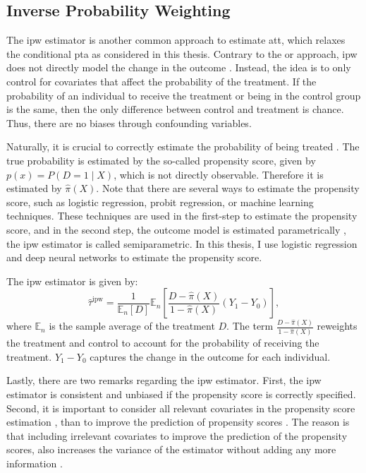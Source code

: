 \subsection{Inverse Probability Weighting}
The \ac{ipw} estimator is another common approach to estimate \ac{att}, which relaxes the conditional \ac{pta} as considered in this thesis.
Contrary to the \ac{or} approach, \ac{ipw} does not directly model the change in the outcome \citep{santannaDoublyRobustDifferenceindifferences2020}.
Instead, the idea is to only control for covariates that affect the probability of the treatment.
If the probability of an individual to receive the treatment or being in the control group is the same, then the only difference between control and treatment is chance.
Thus, there are no biases through confounding variables.

Naturally, it is crucial to correctly estimate the probability of being treated \citep{angrist2009mostly}.
The true probability is estimated by the so-called propensity score, given by $p(x) = P(D=1 \mid X)$, which is not directly observable.
Therefore it is estimated by $\hat{\pi}(X)$.
Note that there are several ways to estimate the propensity score, such as logistic regression, probit regression, or machine learning techniques.
These techniques are used in the first-step to estimate the propensity score, and in the second step, the outcome model is estimated parametrically \citep{abadieSemiparametricDifferenceinDifferencesEstimators2005}, the \ac{ipw} estimator is called semiparametric.
In this thesis, I use logistic regression and deep neural networks to estimate the propensity score.

The \ac{ipw} estimator is given by:
\begin{equation}
\hat{\tau}^{\text{ipw}} = \frac{1}{\mathbb{E}_n[D]} \mathbb{E}_n \left[ \frac{D - \hat{\pi}(X)}{1 - \hat{\pi}(X)} (Y_1 - Y_0) \right],
\label{eq:4}
\end{equation}
where $\mathbb{E}_n$  is the sample average of the treatment $D$.
The term $\frac{D - \hat{\pi}(X)}{1 - \hat{\pi}(X)}$ reweights the treatment and control to account for the probability of receiving the treatment.
$Y_1 - Y_0$ captures the change in the outcome for each individual.


Lastly, there are two remarks regarding the \ac{ipw} estimator.
First, the \ac{ipw} estimator is consistent and unbiased if the propensity score is correctly specified.
Second, it is important to consider all relevant covariates in the propensity score estimation \citep{angrist2009mostly}, than to improve the prediction of propensity scores \citep{hernanCausalInferenceWhat}.
The reason is that including irrelevant covariates to improve the prediction of the propensity scores, also increases the variance of the estimator without adding any more information \citep{hernanCausalInferenceWhat}.

